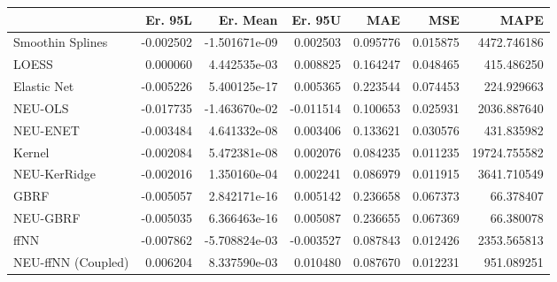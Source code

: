 \begin{tabular}{lrrrrrr}
\toprule
{} &   Er. 95L &      Er. Mean &   Er. 95U &       MAE &       MSE &          MAPE \\
\midrule
Smoothin Splines   & -0.002502 & -1.501671e-09 &  0.002503 &  0.095776 &  0.015875 &   4472.746186 \\
LOESS              &  0.000060 &  4.442535e-03 &  0.008825 &  0.164247 &  0.048465 &    415.486250 \\
Elastic Net        & -0.005226 &  5.400125e-17 &  0.005365 &  0.223544 &  0.074453 &    224.929663 \\
NEU-OLS            & -0.017735 & -1.463670e-02 & -0.011514 &  0.100653 &  0.025931 &   2036.887640 \\
NEU-ENET           & -0.003484 &  4.641332e-08 &  0.003406 &  0.133621 &  0.030576 &    431.835982 \\
Kernel             & -0.002084 &  5.472381e-08 &  0.002076 &  0.084235 &  0.011235 &  19724.755582 \\
NEU-KerRidge       & -0.002016 &  1.350160e-04 &  0.002241 &  0.086979 &  0.011915 &   3641.710549 \\
GBRF               & -0.005057 &  2.842171e-16 &  0.005142 &  0.236658 &  0.067373 &     66.378407 \\
NEU-GBRF           & -0.005035 &  6.366463e-16 &  0.005087 &  0.236655 &  0.067369 &     66.380078 \\
ffNN               & -0.007862 & -5.708824e-03 & -0.003527 &  0.087843 &  0.012426 &   2353.565813 \\
NEU-ffNN (Coupled) &  0.006204 &  8.337590e-03 &  0.010480 &  0.087670 &  0.012231 &    951.089251 \\
\bottomrule
\end{tabular}
